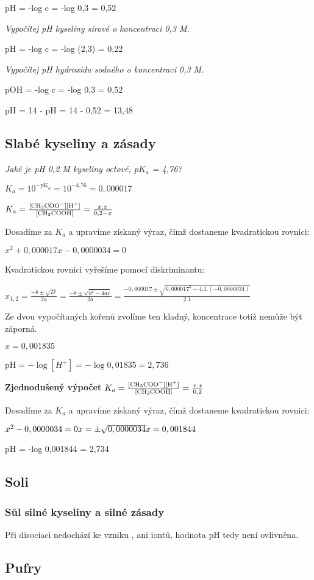 
pH = -log c = -log 0,3 = 0,52

\textit{Vypočítej pH kyseliny sírové o koncentraci 0,3 M.}


pH = -log c = -log (2,3) = 0,22

\textit{Vypočítej pH hydroxidu sodného o koncentraci 0,3 M.}


pOH = -log c = -log 0,3 = 0,52

pH = 14 - pH = 14 - 0,52 = 13,48

\newpage

\subsection{Slabé kyseliny a zásady}
\emph{Jaké je pH 0,2 M kyseliny octové, p$K_a$ = 4,76?}


$K_a = 10^{-\textrm{pK}_a} = 10^{-4.76} = 0,000017$

$K_a = \frac{[\ce{CH3COO^-}][\ce{H^+}]}{[\ce{CH3COOH}]} = \frac{x.x}{0,2-x}$

Dosadíme za $K_a$ a upravíme získaný výraz, čímž dostaneme kvadratickou rovnici:

$x^2 + 0,000017x - 0,0000034 = 0$

Kvadratickou rovnici vyřešíme pomocí diskriminantu:

$x_{1,2} = \frac{-b \pm \sqrt{D}}{2a} = \frac{-b \pm \sqrt{b^2 - 4ac}}{2a} = \frac{-0,000017 \pm \sqrt{0,000017^2 - 4.1.(-0,0000034)}}{2.1}$

Ze dvou vypočítaných kořenů zvolíme ten kladný, koncentrace totiž nemůže být záporná.

$x = 0,001835$

$\textrm{pH} = -\log[H^+] = -\log0,01835 = 2,736$

\textbf{Zjednodušený výpočet}
$K_a = \frac{[\ce{CH3COO^-}][\ce{H^+}]}{[\ce{CH3COOH}]} = \frac{x.x}{0,2}$

Dosadíme za $K_a$ a upravíme získaný výraz, čímž dostaneme kvadratickou rovnici:

$x^2 - 0,0000034 = 0\\
x = \pm\sqrt{0,0000034}\\
x = 0,001844$

pH = -log 0,001844 = 2,734

\subsection{Soli}
\subsubsection{Sůl silné kyseliny a silné zásady}


Při disociaci nedochází ke vzniku , ani  iontů, hodnota pH tedy není ovlivněna.

\subsection{Pufry}


\clearpage